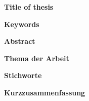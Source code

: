 %
%
\newpage
\thispagestyle{plain}
\clearpage
\hfuzz=12pt       %


\textbf{\IthesisAuthor}

\vspace{0.3cm}
\textbf{Title of thesis}

\IthesisTitleEN

\vspace{0.3cm}
\textbf{Keywords}

\begin{minipage}{\textwidth}
  \IkeyWordsEN
\end{minipage}

\vspace{0.3cm}
\textbf{Abstract}

\IabstractEN


\newpage
\thispagestyle{plain}
\clearpage


\textbf{\IthesisAuthor}

\vspace{0.3cm}
\textbf{Thema der Arbeit}

\IthesisTitle

\vspace{0.3cm}
\textbf{Stichworte}

\IkeyWordsDE

\vspace{0.3cm}
\textbf{Kurzzusammenfassung}

\IabstractDE
